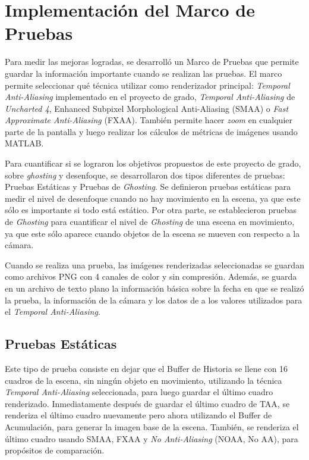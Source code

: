 \documentclass[pregrado]{tesis-usb} %
\begin{document}
\section{Implementación del Marco de Pruebas}
Para medir las mejoras logradas, se desarrolló un Marco de Pruebas que permite guardar la información importante cuando se realizan las pruebas. El marco permite seleccionar qué técnica utilizar como renderizador principal: \textit{Temporal Anti-Aliasing} implementado en el proyecto de grado, \textit{Temporal Anti-Aliasing} de \textit{Uncharted 4},  Enhanced Subpixel Morphological Anti-Aliasing (SMAA) o \textit{Fast Approximate Anti-Aliasing} (FXAA). También permite hacer \textit{zoom} en cualquier parte de la pantalla y luego realizar los cálculos de métricas de imágenes usando MATLAB.

Para cuantificar si se lograron los objetivos propuestos de este proyecto de grado, sobre \textit{ghosting} y desenfoque, se desarrollaron dos tipos diferentes de pruebas: Pruebas Estáticas y Pruebas de \textit{Ghosting}.  Se definieron pruebas estáticas para medir el nivel de desenfoque cuando no hay movimiento en la escena, ya que este sólo es importante si todo está estático. Por otra parte, se establecieron pruebas de \textit{Ghosting} para cuantificar el nivel de \textit{Ghosting} de una escena en movimiento, ya que este sólo aparece cuando objetos de la escena se mueven con respecto a la cámara. 

Cuando se realiza una prueba, las imágenes renderizadas seleccionadas se guardan como archivos PNG con 4 canales de color y sin compresión. Además, se guarda en un archivo de texto plano la información básica sobre la fecha en que se realizó la prueba, la información de la cámara y los datos de a los valores utilizados para el \textit{Temporal Anti-Aliasing}.


\subsection{Pruebas Estáticas}
Este tipo de prueba consiste en dejar que el Buffer de Historia se llene con 16 cuadros de la escena, sin ningún objeto en movimiento, utilizando la técnica \textit{Temporal Anti-Aliasing} seleccionada, para luego guardar el último cuadro renderizado. Inmediatamente después de guardar el último cuadro de TAA, se renderiza el último cuadro nuevamente pero ahora utilizando el Buffer de Acumulación, para generar la imagen base de la escena. También, se renderiza el último cuadro usando SMAA, FXAA y \textit{No Anti-Aliasing} (NOAA, No AA), para propósitos de comparación.
\end{document}
